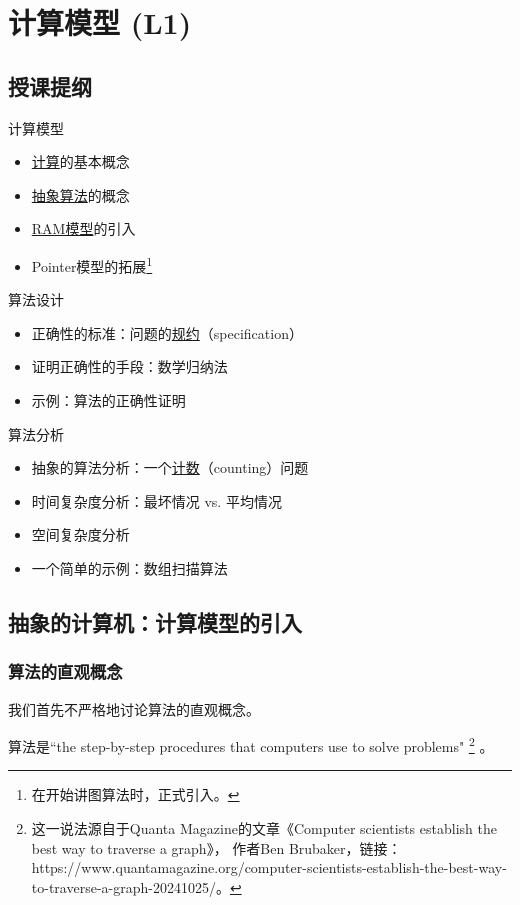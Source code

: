 \chapter{计算模型 (L1)}

\section*{授课提纲}

\nid 计算模型
\begin{itemize}
    \item \ul{计算}的基本概念
    \item \ul{抽象算法}的概念
    \item \ul{RAM模型}的引入
    \item Pointer模型的拓展\footnote{在开始讲图算法时，正式引入。}
\end{itemize}

\nid 算法设计
\begin{itemize}
    \item 正确性的标准：问题的\ul{规约}（specification）
    \item 证明正确性的手段：数学归纳法
    \item 示例：算法的正确性证明
\end{itemize}

\nid 算法分析
\begin{itemize}
    \item 抽象的算法分析：一个\ul{计数}（counting）问题
    \item 时间复杂度分析：最坏情况 vs. 平均情况
    \item 空间复杂度分析
    \item 一个简单的示例：数组扫描算法
\end{itemize}

\section{抽象的计算机：计算模型的引入}

\subsection{算法的直观概念} \label{subsec:alg}

我们首先不严格地讨论算法的直观概念。

算法是``the step-by-step procedures that computers use to solve problems"
    \footnote{这一说法源自于Quanta Magazine的文章《Computer scientists establish the best way to traverse a graph》，
    作者Ben Brubaker，链接：
    https://www.quantamagazine.org/computer-scientists-establish-the-best-way-to-traverse-a-graph-20241025/。}
    。

